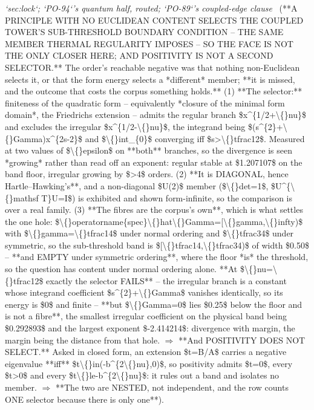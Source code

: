 \begin{description}
\textit{`sec:lock`; `PO-94`'s quantum half, routed; `PO-89`'s coupled-edge clause} \ (**A PRINCIPLE WITH NO EUCLIDEAN CONTENT SELECTS THE COUPLED TOWER'S SUB-THRESHOLD BOUNDARY CONDITION -- THE SAME MEMBER THERMAL REGULARITY IMPOSES -- SO THE FACE IS NOT THE ONLY CLOSER HERE; AND POSITIVITY IS NOT A SECOND SELECTOR.** The order's reachable negative was that nothing non-Euclidean selects it, or that the form energy selects a *different* member;  **it is missed, and the outcome that costs the corpus something holds.** (1) **The selector:** finiteness of the quadratic form -- equivalently *closure of the minimal form domain*, the Friedrichs extension -- admits the regular branch \$x\textasciicircum{}\{1/2+\textbackslash\{\}nu\}\$ and excludes the irregular \$x\textasciicircum{}\{1/2-\textbackslash\{\}nu\}\$, the integrand being \$(s\textasciicircum{}\{2\}+\textbackslash\{\}Gamma)x\textasciicircum{}\{2s-2\}\$ and \$\textbackslash\{\}int\_\{0\}\$ converging iff \$s>\textbackslash\{\}tfrac12\$. Measured at two values of \$\textbackslash\{\}epsilon\$ on **both** branches, so the divergence is seen *growing* rather than read off an exponent: regular stable at \$1.207107\$ on the band floor, irregular growing by \$>4\$ orders. (2) **It is DIAGONAL, hence Hartle--Hawking's**, and a non-diagonal \$U(2)\$ member (\$\textbackslash\{\}det=1\$, \$U\textasciicircum{}\{\textbackslash\{\}mathsf T\}U=I\$) is exhibited and shown form-infinite, so the comparison is over a real family. (3) **The fibres are the corpus's own**, which is what settles the one hole: \$\textbackslash\{\}operatorname\{spec\}\textbackslash\{\}hat\textbackslash\{\}Gamma=[\textbackslash\{\}gamma,\textbackslash\{\}infty)\$ with \$\textbackslash\{\}gamma=\textbackslash\{\}tfrac14\$ under normal ordering and \$\textbackslash\{\}tfrac34\$ under symmetric, so the sub-threshold band is \$[\textbackslash\{\}tfrac14,\textbackslash\{\}tfrac34)\$ of width \$0.50\$ -- **and EMPTY under symmetric ordering**, where the floor *is* the threshold, so the question has content under normal ordering alone.  **At \$\textbackslash\{\}nu=\textbackslash\{\}tfrac12\$ exactly the selector FAILS** -- the irregular branch is a constant whose integrand coefficient \$s\textasciicircum{}\{2\}+\textbackslash\{\}Gamma\$ vanishes identically, so its energy is \$0\$ and finite -- **but \$\textbackslash\{\}Gamma=0\$ lies \$0.25\$ below the floor and is not a fibre**, the smallest irregular coefficient on the physical band being \$0.292893\$ and the largest exponent \$-2.414214\$: divergence with margin, the margin being the distance from that hole. \ensuremath{\Rightarrow}  **And POSITIVITY DOES NOT SELECT.** Asked in closed form, an extension \$t=B/A\$ carries a negative eigenvalue **iff** \$t\textbackslash\{\}in(-b\textasciicircum{}\{2\textbackslash\{\}nu\},0)\$, so positivity admits \$t=0\$, every \$t>0\$ and every \$t\textbackslash\{\}le-b\textasciicircum{}\{2\textbackslash\{\}nu\}\$: it rules out a band and isolates no member. \ensuremath{\Rightarrow} **The two are NESTED, not independent, and the row counts ONE selector because there is only one**). 

\end{description}
